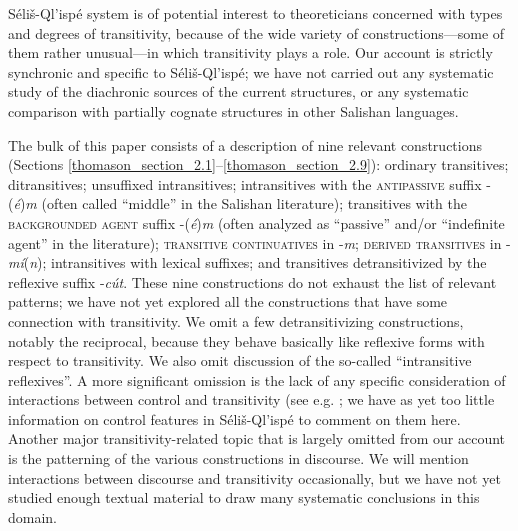 \documentclass[output=paper,colorlinks,citecolor=brown]{langscibook}
\begin{document}
  S\'eli\v{s}-Ql'isp\'e system is of potential interest to
  theoreticians concerned with types and degrees of transitivity,
  because of the wide variety of constructions---some of them
  rather unusual---in which transitivity plays a role.  Our account
  is strictly synchronic and specific to S\'eli\v{s}-Ql'isp\'e; we
  have not carried out any systematic study of the diachronic sources
  of the current structures, or any systematic comparison with
  partially cognate structures in other Salishan languages.


  The bulk of this paper consists of a description of nine relevant
  constructions (Sections \ref{thomason_section_2.1}--\ref{thomason_section_2.9}): ordinary transitives; ditransitives;
  unsuffixed intransitives; intransitives with the
  \textsc{antipassive} suffix -(\emph{\'e})\emph{m} (often called
  ``middle'' in the Salishan literature); transitives with the
  \textsc{backgrounded agent} suffix -(\emph{\'e})\emph{m} (often
  analyzed as ``passive'' and/or ``indefinite agent'' in the
  literature); \textsc{transitive continuatives} in -\emph{m};
  \textsc{derived transitives} in -\emph{m\'i}(\emph{n});
  intransitives with lexical suffixes; and transitives
  detransitivized by the reflexive suffix -\emph{c\'ut}.  These nine
  constructions do not exhaust the list of relevant patterns; we have
  not yet explored all the constructions that have some connection
  with transitivity.  We omit a few detransitivizing constructions,
  notably the reciprocal, because they behave basically like
  reflexive forms with respect to transitivity.  We also omit
  discussion of the so-called ``intransitive reflexives''.  A more
  significant omission is the lack of any specific consideration of
  interactions between control and transitivity (see
  e.g. \citealt{Thompson:1985}; we have as yet too little information
  on control features in S\'eli\v{s}-Ql'isp\'e to comment on them
  here.  Another major transitivity-related topic that is largely
  omitted from our account is the patterning of the various
  constructions in discourse.  We will mention interactions between
  discourse and transitivity occasionally, but we have not yet
  studied enough textual material to draw many systematic conclusions
  in this domain.
\end{document}
